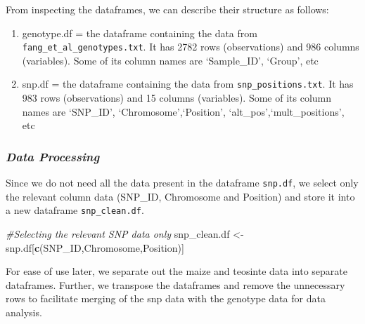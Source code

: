 \documentclass[
]{article}
\newenvironment{Shaded}{\begin{snugshade}}{\end{snugshade}}
\newcommand{\CommentTok}[1]{\textcolor[rgb]{0.56,0.35,0.01}{\textit{#1}}}
\newcommand{\FunctionTok}[1]{\textcolor[rgb]{0.13,0.29,0.53}{\textbf{#1}}}
\newcommand{\NormalTok}[1]{#1}
\newcommand{\OtherTok}[1]{\textcolor[rgb]{0.56,0.35,0.01}{#1}}
\newcommand{\StringTok}[1]{\textcolor[rgb]{0.31,0.60,0.02}{#1}}
\begin{document}
From inspecting the dataframes, we can describe their structure as
follows:

\begin{enumerate}
\def\labelenumi{\arabic{enumi}.}
\item
  genotype.df = the dataframe containing the data from
  \texttt{fang\_et\_al\_genotypes.txt}. It has 2782 rows (observations)
  and 986 columns (variables). Some of its column names are
  `Sample\_ID', `Group', etc
\item
  snp.df = the dataframe containing the data from
  \texttt{snp\_positions.txt}. It has 983 rows (observations) and 15
  columns (variables). Some of its column names are `SNP\_ID',
  `Chromosome',`Position', `alt\_pos',`mult\_positions', etc
\end{enumerate}

\subsubsection{\texorpdfstring{\emph{Data
Processing}}{Data Processing}}\label{data-processing}

Since we do not need all the data present in the dataframe
\texttt{snp.df}, we select only the relevant column data (SNP\_ID,
Chromosome and Position) and store it into a new dataframe
\texttt{snp\_clean.df}.

\begin{Shaded}
\begin{Highlighting}[]
\CommentTok{\#Selecting the relevant SNP data only}
\NormalTok{snp\_clean.df }\OtherTok{\textless{}{-}}\NormalTok{ snp.df[}\FunctionTok{c}\NormalTok{(}\StringTok{\textquotesingle{}SNP\_ID\textquotesingle{}}\NormalTok{,}\StringTok{\textquotesingle{}Chromosome\textquotesingle{}}\NormalTok{,}\StringTok{\textquotesingle{}Position\textquotesingle{}}\NormalTok{)]}
\end{Highlighting}
\end{Shaded}

For ease of use later, we separate out the maize and teosinte data into
separate dataframes. Further, we transpose the dataframes and remove the
unnecessary rows to facilitate merging of the snp data with the genotype
data for data analysis.
\end{document}
